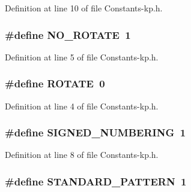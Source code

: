 Definition at line 10 of file Constants-\/kp.\-h.

\hypertarget{_constants-kp_8h_ad30aa04d0c2e0be52306deb2c60dff35}{
\subsubsection[{N\-O\-\_\-\-R\-O\-T\-A\-T\-E}]{\setlength{\rightskip}{0pt plus 5cm}\#define N\-O\-\_\-\-R\-O\-T\-A\-T\-E~1}}\label{_constants-kp_8h_ad30aa04d0c2e0be52306deb2c60dff35}


Definition at line 5 of file Constants-\/kp.\-h.

\hypertarget{_constants-kp_8h_ae38c87f421906975bf7500c3b779fbd1}{
\subsubsection[{R\-O\-T\-A\-T\-E}]{\setlength{\rightskip}{0pt plus 5cm}\#define R\-O\-T\-A\-T\-E~0}}\label{_constants-kp_8h_ae38c87f421906975bf7500c3b779fbd1}


Definition at line 4 of file Constants-\/kp.\-h.

\hypertarget{_constants-kp_8h_a591937bc56bfef3fd4e606da1e9bb6e1}{
\subsubsection[{S\-I\-G\-N\-E\-D\-\_\-\-N\-U\-M\-B\-E\-R\-I\-N\-G}]{\setlength{\rightskip}{0pt plus 5cm}\#define S\-I\-G\-N\-E\-D\-\_\-\-N\-U\-M\-B\-E\-R\-I\-N\-G~1}}\label{_constants-kp_8h_a591937bc56bfef3fd4e606da1e9bb6e1}


Definition at line 8 of file Constants-\/kp.\-h.

\hypertarget{_constants-kp_8h_a5daa478426a73c9de86ceb44488ca3d8}{
\subsubsection[{S\-T\-A\-N\-D\-A\-R\-D\-\_\-\-P\-A\-T\-T\-E\-R\-N}]{\setlength{\rightskip}{0pt plus 5cm}\#define S\-T\-A\-N\-D\-A\-R\-D\-\_\-\-P\-A\-T\-T\-E\-R\-N~1}}\label{_constants-kp_8h_a5daa478426a73c9de86ceb44488ca3d8}


